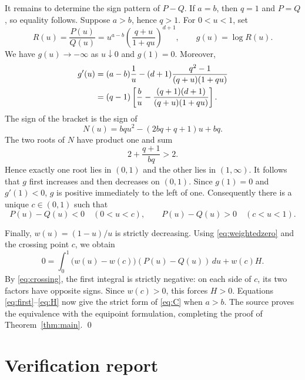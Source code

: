 \documentclass[11pt]{article}
\begin{document}
It remains to determine the sign pattern of $P-Q$. If $a=b$, then $q=1$ and
$P=Q$, so equality follows. Suppose $a>b$, hence $q>1$. For $0<u<1$, set
\[
 R(u)=\frac{P(u)}{Q(u)}
 =u^{a-b}\left(\frac{q+u}{1+qu}\right)^{d+1},
 \qquad g(u)=\log R(u).
\]
We have $g(u)\to-\infty$ as $u\downarrow0$ and $g(1)=0$. Moreover,
\begin{align}
 g'(u)
 &=(a-b)\frac1u
   -(d+1)\frac{q^2-1}{(q+u)(1+qu)} \notag\\
 &=(q-1)\left[
   \frac bu-\frac{(q+1)(d+1)}{(q+u)(1+qu)}
   \right].
 \label{eq:gprime}
\end{align}
The sign of the bracket is the sign of
\begin{equation}
 N(u)=bq u^2-(2bq+q+1)u+bq.
 \label{eq:N}
\end{equation}
The two roots of $N$ have product one and sum
\[
 2+\frac{q+1}{bq}>2.
\]
Hence exactly one root lies in $(0,1)$ and the other lies in $(1,\infty)$.
It follows that $g$ first increases and then decreases on $(0,1)$. Since
$g(1)=0$ and $g'(1)<0$, $g$ is positive immediately to the left of one.
Consequently there is a unique $c\in(0,1)$ such that
\begin{equation}
 P(u)-Q(u)<0\quad(0<u<c),
 \qquad
 P(u)-Q(u)>0\quad(c<u<1).
 \label{eq:crossing}
\end{equation}

Finally, $w(u)=(1-u)/u$ is strictly decreasing. Using
\eqref{eq:weightedzero} and the crossing point $c$, we obtain
\[
 0=\int_0^1\bigl(w(u)-w(c)\bigr)(P(u)-Q(u))\,du+w(c)H.
\]
By \eqref{eq:crossing}, the first integral is strictly negative: on each side
of $c$, its two factors have opposite signs. Since $w(c)>0$, this forces
$H>0$. Equations \eqref{eq:first}--\eqref{eq:H} now give the strict form of
\eqref{eq:C} when $a>b$. The source proves the equivalence with the equipoint
formulation, completing the proof of Theorem~\ref{thm:main}. \qed

\section{Verification report}
\end{document}
